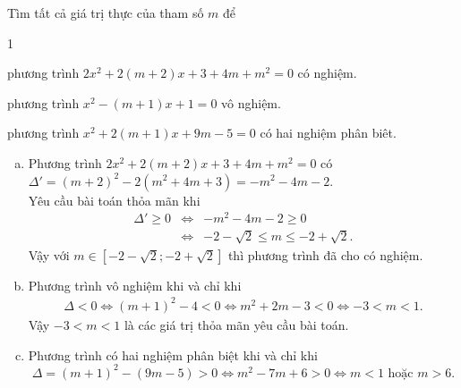 \begin{ex}%
	Tìm tất cả giá trị thực của tham số $m$ để
	\begin{enumEX}[a)]{1}
		\item phương trình $2x^2+2\left( m+2 \right)x+3+4m+{m^2}=0$ có nghiệm.
		\item phương trình $x^2-(m+1)x+1=0$ vô nghiệm.
		\item phương trình $x^2+2(m+1)x+9m-5=0$ có hai nghiệm phân biêt.
	\end{enumEX}
	\loigiai
	{\begin{enumerate}[a)]
			\item Phương trình $2x^2+2(m+2)x+3+4m+m^2=0$ có $\Delta'=(m+2)^2-2(m^2+4m+3) = -m^2-4m-2$.\\
			Yêu cầu bài toán thỏa mãn khi
			\allowdisplaybreaks
			\begin{eqnarray*}
				\Delta' \geq 0 &\Leftrightarrow & -m^2-4m-2 \geq 0\\
				&\Leftrightarrow & -2-\sqrt{2} \leq m \leq -2+\sqrt{2}.
			\end{eqnarray*}
			Vậy với $m \in \left[-2-\sqrt{2};-2+\sqrt{2}\right]$ thì phương trình đã cho có nghiệm.
			\item Phương trình vô nghiệm khi và chỉ khi
			\begin{eqnarray*}
				\Delta <0 \Leftrightarrow (m+1)^2-4<0 \Leftrightarrow m^2+2m-3<0 \Leftrightarrow -3<m<1.
			\end{eqnarray*}
			Vậy $-3<m<1$ là các giá trị thỏa mãn yêu cầu bài toán.
			\item Phương trình có hai nghiệm phân biệt khi và chỉ khi
			$$\Delta=(m+1)^2-(9m-5)>0 \Leftrightarrow m^2-7m+6>0 \Leftrightarrow m<1 \text{ hoặc } m>6.$$
		\end{enumerate}
	}
\end{ex}
